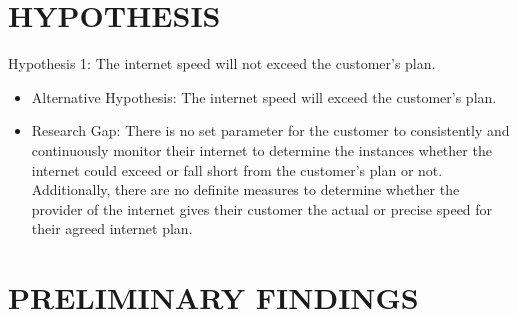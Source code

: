 \documentclass[conference]{IEEEtran}
\begin{document}
\section{HYPOTHESIS}
Hypothesis 1: The internet speed will not exceed the customer's plan.
\begin{itemize}
    \item Alternative Hypothesis: The internet speed will exceed the customer's plan.
    \item Research Gap: There is no set parameter for the customer to consistently and continuously monitor their internet to determine the instances whether the internet could exceed or fall short from the customer's plan or not. Additionally, there are no definite measures to determine whether the provider of the internet gives their customer the actual or precise speed for their agreed internet plan.
\end{itemize}

\section{PRELIMINARY FINDINGS}
\end{document}
